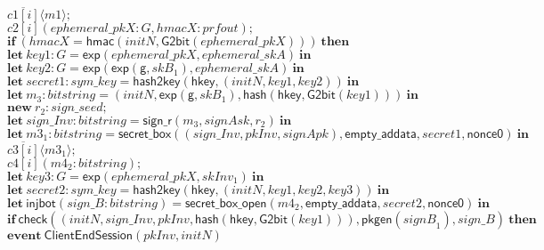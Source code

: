 \documentclass{article}
\newcommand{\cinput}[2]{{#1}({#2})}
\newcommand{\coutput}[2]{\overline{#1}\langle{#2}\rangle}
\newcommand{\kw}[1]{\mathbf{#1}}
\newcommand{\kwf}[1]{\mathsf{#1}}
\newcommand{\var}[1]{\mathit{#1}}
\newcommand{\kwt}[1]{\mathit{#1}}
\newcommand{\kwc}[1]{\mathit{#1}}
\begin{document}
\begin{tabbing}
\>$\quad \coutput{\kwc{c1}[\var{i}]}{\var{m1}};$\\
\>$\quad \cinput{\kwc{c2}[\var{i}]}{\var{ephemeral{\_}pkX}: \kwt{G}, \var{hmacX}: \kwt{prfout}};$\\
\>$\quad \kw{if}\ (\var{hmacX}  =  \kwf{hmac}(\var{initN}, \kwf{G2bit}(\var{ephemeral{\_}pkX})))\ \kw{then}$\\
\>$\quad \kw{let}\ \var{key1}: \kwt{G} = \kwf{exp}(\var{ephemeral{\_}pkX}, \var{ephemeral{\_}skA})\ \kw{in}$\\
\>$\quad \kw{let}\ \var{key2}: \kwt{G} = \kwf{exp}(\kwf{exp}(\kwf{g}, \var{skB}_{1}), \var{ephemeral{\_}skA})\ \kw{in}$\\
\>$\quad \kw{let}\ \var{secret1}: \kwt{sym{\_}key} = \kwf{hash2key}(\kwf{hkey}, \kwf{}(\var{initN}, \var{key1}, \var{key2}))\ \kw{in}$\\
\>$\quad \kw{let}\ \var{m}_{3}: \kwt{bitstring} = \kwf{}(\var{initN}, \kwf{exp}(\kwf{g}, \var{skB}_{1}), \kwf{hash}(\kwf{hkey}, \kwf{G2bit}(\var{key1})))\ \kw{in}$\\
\>$\quad \kw{new}\ \var{r}_{2}: \kwt{sign{\_}seed};$\\
\>$\quad \kw{let}\ \var{sign{\_}Inv}: \kwt{bitstring} = \kwf{sign{\_}r}(\var{m}_{3}, \var{signAsk}, \var{r}_{2})\ \kw{in}$\\
\>$\quad \kw{let}\ \var{m3}_{1}: \kwt{bitstring} = \kwf{secret{\_}box}(\kwf{}(\var{sign{\_}Inv}, \var{pkInv}, \var{signApk}), \kwf{empty{\_}addata}, \var{secret1}, \kwf{nonce0})\ \kw{in}$\\
\>$\quad \coutput{\kwc{c3}[\var{i}]}{\var{m3}_{1}};$\\
\>$\quad \cinput{\kwc{c4}[\var{i}]}{\var{m4}_{2}: \kwt{bitstring}};$\\
\>$\quad \kw{let}\ \var{key3}: \kwt{G} = \kwf{exp}(\var{ephemeral{\_}pkX}, \var{skInv}_{1})\ \kw{in}$\\
\>$\quad \kw{let}\ \var{secret2}: \kwt{sym{\_}key} = \kwf{hash2key}(\kwf{hkey}, \kwf{}(\var{initN}, \var{key1}, \var{key2}, \var{key3}))\ \kw{in}$\\
\>$\quad \kw{let}\ \kwf{injbot}(\var{sign{\_}B}: \kwt{bitstring}) = \kwf{secret{\_}box{\_}open}(\var{m4}_{2}, \kwf{empty{\_}addata}, \var{secret2}, \kwf{nonce0})\ \kw{in}$\\
\>$\quad \kw{if}\ \kwf{check}(\kwf{}(\var{initN}, \var{sign{\_}Inv}, \var{pkInv}, \kwf{hash}(\kwf{hkey}, \kwf{G2bit}(\var{key1}))), \kwf{pkgen}(\var{signB}_{1}), \var{sign{\_}B})\ \kw{then}$\\
\>$\quad \kw{event}\ \kwf{ClientEndSession}(\var{pkInv}, \var{initN})$\\

\end{tabbing}
\end{document}
